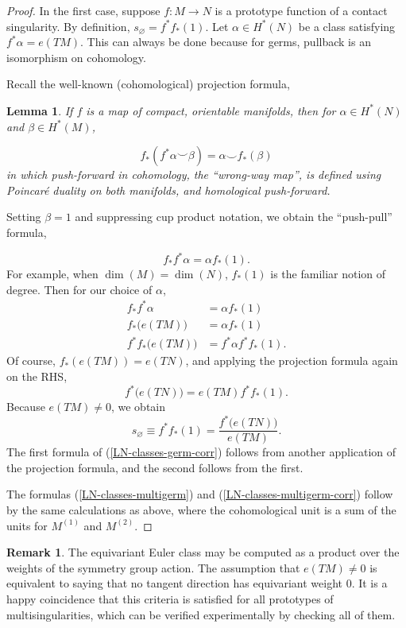 \documentclass[11pt]{article}
\theoremstyle{plain}
\newtheorem{lemma}[fact]{Lemma}
\theoremstyle{definition}
\newtheorem{remark}[fact]{Remark}
\theoremstyle{definition}
\let\emptyset\varnothing
\begin{document}
\begin{proof}
In the first case, suppose $f:M\to N$ is a prototype function of a contact singularity. By definition, $s_\emptyset=f^*f_*(1)$. Let $\alpha\in H^*(N)$ be a class satisfying $f^*\alpha=e(TM)$. This can always be done because for germs, pullback is an isomorphism on cohomology.

Recall the well-known (cohomological) projection formula,

\begin{lemma}
If $f$ is a map of compact, orientable manifolds, then for $\alpha \in H^*(N)$ and $\beta \in H^*(M)$,

\[
f_*(f^*\alpha\smile \beta)=\alpha\smile f_*(\beta)
\]
in which push-forward in cohomology, the ``wrong-way map'', is defined using Poincar\'e duality on both manifolds, and homological push-forward.

\end{lemma}

Setting $\beta=1$ and suppressing cup product notation, we obtain the ``push-pull'' formula,

\[
f_*f^*\alpha=\alpha f_*(1).
\]
For example, when $\dim(M)=\dim(N)$, $f_*(1)$ is the familiar notion of degree. Then for our choice of $\alpha$,
\begin{align*}
f_*f^*\alpha&=\alpha f_*(1)\\
f_*\big(e(TM)\big)&=\alpha f_*(1)\\
f^*f_*\big(e(TM)\big) &=f^*\alpha f^*f_*(1).
\end{align*}
Of course, $f_*(e(TM))=e(TN)$, and applying the projection formula again on the RHS, 
\[
f^*\big(e(TN)\big)=e(TM)f^*f_*(1).
\]
Because $e(TM)\ne 0$, we obtain
\[
s_\emptyset\equiv f^*f_*(1)=\frac{f^*\big(e(TN)\big)}{e(TM)}.
\]
The first formula of (\ref{LN-classes-germ-corr}) follows from another application of the projection formula, and the second follows from the first.

The formulas (\ref{LN-classes-multigerm}) and (\ref{LN-classes-multigerm-corr}) follow by the same calculations as above, where the cohomological unit is a sum of the units for $M^{(1)}$ and $M^{(2)}$. 

\end{proof}

\begin{remark}
    The equivariant Euler class may be computed as a product over the weights of the symmetry group action. The assumption that $e(TM)\ne 0$ is equivalent to saying that no tangent direction has equivariant weight 0. It is a happy coincidence that this criteria is satisfied for all prototypes of multisingularities, which can be verified experimentally by checking all of them.
    
\end{remark}
\end{document}
